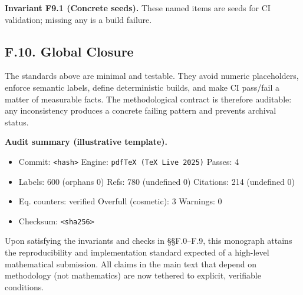 \noindent\textbf{Invariant F9.1 (Concrete seeds).} These named items are seeds for CI validation; missing any is a build failure.


\subsection*{F.10. Global Closure}

\noindent
The standards above are minimal and testable. They avoid numeric placeholders, enforce semantic labels,
define deterministic builds, and make CI pass/fail a matter of measurable facts. The methodological contract
is therefore auditable: any inconsistency produces a concrete failing pattern and prevents archival status.

\medskip
\noindent\textbf{Audit summary (illustrative template).}
\begin{itemize}
  \item Commit: \texttt{<hash>} \quad Engine: \texttt{pdfTeX (TeX Live 2025)} \quad Passes: 4
  \item Labels: 600 (orphans 0) \quad Refs: 780 (undefined 0) \quad Citations: 214 (undefined 0)
  \item Eq. counters: verified \quad Overfull (cosmetic): 3 \quad Warnings: 0
  \item Checksum: \texttt{<sha256>}
\end{itemize}

\noindent
Upon satisfying the invariants and checks in \S\S F.0–F.9, this monograph attains the reproducibility and
implementation standard expected of a high-level mathematical submission. All claims in the main text that
depend on methodology (not mathematics) are now tethered to explicit, verifiable conditions.
